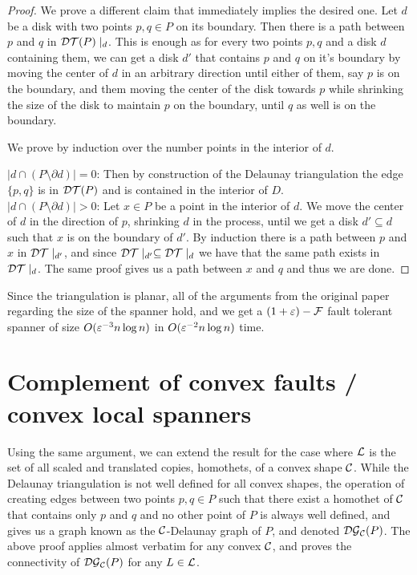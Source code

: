 \documentclass[12pt]{article}%
\begin{document}
\begin{proof}
    We prove a different claim that immediately implies the desired
    one. Let $d$ be a disk with two points $p,q\in P$ on its
    boundary. Then there is a path between $p$ and $q$ in
    $\mathcal{DT}(P)\mid_d$. This is enough as for every two points $p,q$ and a
    disk $d$ containing them, we can get a disk $d'$ that contains $p$
    and $q$ on it's boundary by moving the center of $d$ in an
    arbitrary direction until either of them, say $p$ is on the
    boundary, and them moving the center of the disk towards $p$ while
    shrinking the size of the disk to maintain $p$ on the boundary,
    until $q$ as well is on the boundary.
    
    We prove by induction over the number points in the interior of
    $d$.
    
    $|d\cap (P\setminus \partial d)| = 0$: Then by construction of the Delaunay triangulation the edge $\{p,q\}$ is in $\mathcal{DT}(P)$ and is contained in the interior of $D$.\\
    
    $|d\cap (P\setminus \partial d)| > 0$: Let $x\in P$ be a point in
    the interior of $d$. We move the center of $d$ in the direction of
    $p$, shrinking $d$ in the process, until we get a disk
    $d'\subseteq d$ such that $x$ is on the boundary of $d'$. By
    induction there is a path between $p$ and $x$ in $\mathcal{DT}\mid_{d'}$,
    and since $\mathcal{DT}\mid_{d'}\subseteq \mathcal{DT}\mid_{d}$ we have that the
    same path exists in $\mathcal{DT}\mid_{d}$. The same proof gives us a path
    between $x$ and $q$ and thus we are done.
    
\end{proof}

Since the triangulation is planar, all of the arguments from the
original paper regarding the size of the spanner hold, and we get a
$(1+\varepsilon)-\mathcal{F}$ fault tolerant spanner of size $O(\varepsilon^{-3}n\log n)$ in
$O(\varepsilon^{-2}n\log n)$ time.

\section{Complement of convex faults / convex local spanners}
Using the same argument, we can extend the result for the case where
$\mathcal{L}$ is the set of all scaled and translated copies, homothets, of a
convex shape $\mathcal{C}$. While the Delaunay triangulation is not well
defined for all convex shapes, the operation of creating edges between
two points $p,q\in P$ such that there exist a homothet of $\mathcal{C}$ that
contains only $p$ and $q$ and no other point of $P$ is always well
defined, and gives us a graph known as the $\mathcal{C}$-Delaunay graph of
$P$, and denoted $\mathcal{DG}_{\mathcal{C}}(P)$. The above proof applies almost
verbatim for any convex $\mathcal{C}$, and proves the connectivity of
$\mathcal{DG}_{\mathcal{C}}(P)$ for any $L\in \mathcal{L}$.
\end{document}
